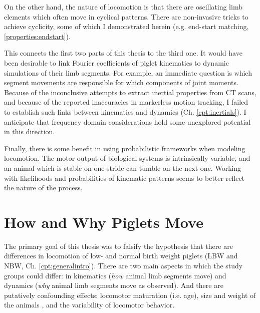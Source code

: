 \begin{change}
On the other hand, the nature of locomotion is that there are oscillating limb elements which often move in cyclical patterns.
There are non-invasive tricks to achieve cyclicity, some of which I demonstrated herein (e.g. end-start matching, \ref{properties:endstart}).


This connects the first two parts of this thesis to the third one.
It would have been desirable to link Fourier coefficients of piglet kinematics to dynamic simulations of their limb segments.
For example, an immediate question is which segment movements are responsible for which components of joint moments.
Because of the inconclusive attempts to extract inertial properties from CT scans, and because of the reported inaccuracies in markerless motion tracking, I failed to establish such links between kinematics and dynamics (Ch. \ref{cpt:inertials}).
I anticipate that frequency domain considerations hold some unexplored potential in this direction.


Finally, there is some benefit in using probabilistic frameworks when modeling locomotion.
The motor output of biological systems is intrinsically variable, and an animal which is stable on one stride can tumble on the next one.
Working with likelihoods and probabilities of kinematic patterns seems to better reflect the nature of the process.
\end{change}


\section{How and Why Piglets Move}
\label{sec:org494f60e}
The primary goal of this thesis was to falsify the hypothesis that there are differences in locomotion of low- and normal birth weight piglets (LBW and NBW, Ch. \ref{cpt:generalintro}).
There are two main aspects in which the study groups could differ: in kinematics (\emph{how} animal limb segments move) and dynamics (\emph{why} animal limb segments move as observed).
And there are putatively confounding effects: locomotor maturation (i.e. age), size and weight of the animals \citep[i.e. physical appearance, cf.][]{Aerts2023}, and the variability of locomotor behavior.


